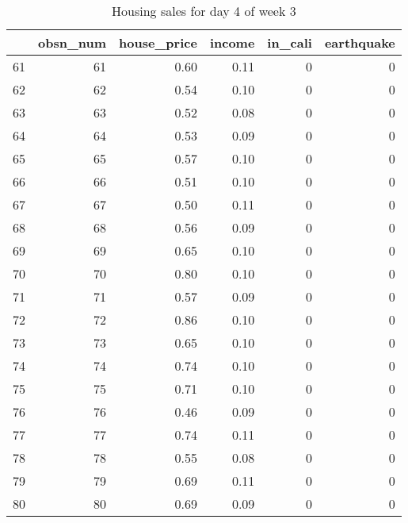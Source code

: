 \begin{table}[ht]
\centering
\begin{tabular}{rrrrrr}
  \hline
 & obsn\_num & house\_price & income & in\_cali & earthquake \\ 
  \hline
61 &  61 & 0.60 & 0.11 &   0 &   0 \\ 
  62 &  62 & 0.54 & 0.10 &   0 &   0 \\ 
  63 &  63 & 0.52 & 0.08 &   0 &   0 \\ 
  64 &  64 & 0.53 & 0.09 &   0 &   0 \\ 
  65 &  65 & 0.57 & 0.10 &   0 &   0 \\ 
  66 &  66 & 0.51 & 0.10 &   0 &   0 \\ 
  67 &  67 & 0.50 & 0.11 &   0 &   0 \\ 
  68 &  68 & 0.56 & 0.09 &   0 &   0 \\ 
  69 &  69 & 0.65 & 0.10 &   0 &   0 \\ 
  70 &  70 & 0.80 & 0.10 &   0 &   0 \\ 
  71 &  71 & 0.57 & 0.09 &   0 &   0 \\ 
  72 &  72 & 0.86 & 0.10 &   0 &   0 \\ 
  73 &  73 & 0.65 & 0.10 &   0 &   0 \\ 
  74 &  74 & 0.74 & 0.10 &   0 &   0 \\ 
  75 &  75 & 0.71 & 0.10 &   0 &   0 \\ 
  76 &  76 & 0.46 & 0.09 &   0 &   0 \\ 
  77 &  77 & 0.74 & 0.11 &   0 &   0 \\ 
  78 &  78 & 0.55 & 0.08 &   0 &   0 \\ 
  79 &  79 & 0.69 & 0.11 &   0 &   0 \\ 
  80 &  80 & 0.69 & 0.09 &   0 &   0 \\ 
   \hline
\end{tabular}
\caption{Housing sales for day 4 of week 3} 
\end{table}
